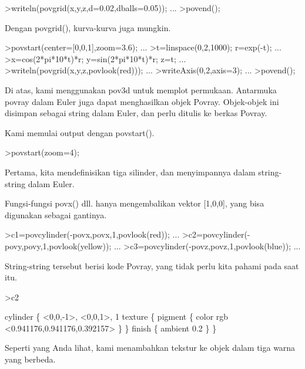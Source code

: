 \documentclass[a4paper,10pt]{article}
\begin{document}
\begin{eulernotebook}
\begin{eulercomment}
\begin{eulercomment}
\begin{eulerprompt}
>writeln(povgrid(x,y,z,d=0.02,dballs=0.05)); ...
>povend();
\end{eulerprompt}
\begin{eulercomment}
Dengan povgrid(), kurva-kurva juga mungkin.
\end{eulercomment}
\begin{eulerprompt}
>povstart(center=[0,0,1],zoom=3.6); ...
>t=linspace(0,2,1000); r=exp(-t); ...
>x=cos(2*pi*10*t)*r; y=sin(2*pi*10*t)*r; z=t; ...
>writeln(povgrid(x,y,z,povlook(red))); ...
>writeAxis(0,2,axis=3); ...
>povend();
\end{eulerprompt}
\begin{eulercomment}
Di atas, kami menggunakan pov3d untuk memplot permukaan. Antarmuka
povray dalam Euler juga dapat menghasilkan objek Povray. Objek-objek
ini disimpan sebagai string dalam Euler, dan perlu ditulis ke berkas
Povray.

Kami memulai output dengan povstart().
\end{eulercomment}
\begin{eulerprompt}
>povstart(zoom=4);
\end{eulerprompt}
\begin{eulercomment}
Pertama, kita mendefinisikan tiga silinder, dan menyimpannya dalam
string-string dalam Euler.

Fungsi-fungsi povx() dll. hanya mengembalikan vektor [1,0,0], yang
bisa digunakan sebagai gantinya.
\end{eulercomment}
\begin{eulerprompt}
>c1=povcylinder(-povx,povx,1,povlook(red)); ...
>c2=povcylinder(-povy,povy,1,povlook(yellow)); ...
>c3=povcylinder(-povz,povz,1,povlook(blue)); ...
\end{eulerprompt}
\begin{eulercomment}
String-string tersebut berisi kode Povray, yang tidak perlu kita
pahami pada saat itu.
\end{eulercomment}
\begin{eulerprompt}
>c2
\end{eulerprompt}
\begin{euleroutput}
  cylinder \{ <0,0,-1>, <0,0,1>, 1
   texture \{ pigment \{ color rgb <0.941176,0.941176,0.392157> \}  \} 
   finish \{ ambient 0.2 \} 
   \}
\end{euleroutput}
\begin{eulercomment}
Seperti yang Anda lihat, kami menambahkan tekstur ke objek dalam tiga
warna yang berbeda.


\end{eulercomment}
\end{eulercomment}
\end{eulercomment}
\end{eulernotebook}
\end{document}
